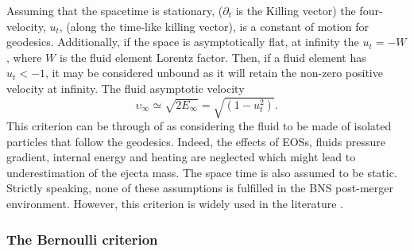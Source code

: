 Assuming that the spacetime is stationary, ($\partial_t$ is the Killing vector)%
the four-velocity, $u_t$, (along the time-like killing vector), 
is a constant of motion for geodesics. 
Additionally, if the space is asymptotically flat, at infinity the $u_t = -W$, 
where $W$ is the fluid element Lorentz factor. 
Then, if a fluid element has $u_t < -1$, it may be considered unbound 
as it will retain the non-zero positive velocity at infinity. 
%
The fluid asymptotic velocity 
\begin{equation}
    \upsilon_{\infty} \simeq \sqrt{2E_{\infty}} = \sqrt{(1-u_t ^2)}.
\end{equation}
%
This criterion can be through of as considering the fluid to be made of isolated 
particles that follow the geodesics. Indeed, the effects of \acp{EOS}, 
fluids pressure gradient, internal energy and heating %
are neglected which might lead to 
underestimation of the ejecta mass. 
%
The space time is also assumed to be static.
%
Strictly speaking, none of these assumptions is 
fulfilled in the \ac{BNS} post-merger environment. However, this criterion 
is widely used in the literature \citep[\eg][]{Radice:2018pdn,Vincent:2019kor}.



\subsubsection{The Bernoulli criterion}

